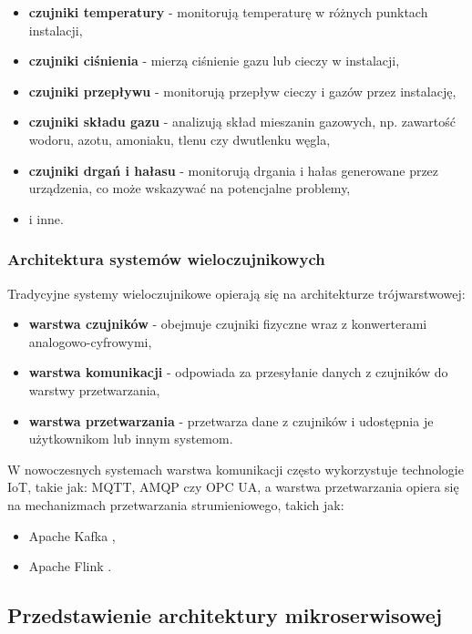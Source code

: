 \begin{itemize}
    \item \textbf{czujniki temperatury} - monitorują temperaturę w różnych punktach instalacji,
    \item \textbf{czujniki ciśnienia} - mierzą ciśnienie gazu lub cieczy w instalacji,
    \item \textbf{czujniki przepływu} - monitorują przepływ cieczy i gazów przez instalację,
    \item \textbf{czujniki składu gazu} - analizują skład mieszanin gazowych, np. zawartość wodoru, azotu, amoniaku, tlenu czy dwutlenku węgla,
    \item \textbf{czujniki drgań i hałasu} - monitorują drgania i hałas generowane przez urządzenia, co może wskazywać na potencjalne problemy,
    \item i inne.
\end{itemize}

\subsubsection{Architektura systemów wieloczujnikowych}
\label{subsubsec:architektura_systemow}

Tradycyjne systemy wieloczujnikowe opierają się na architekturze trójwarstwowej:

\begin{itemize}
    \item \textbf{warstwa czujników} - obejmuje czujniki fizyczne wraz z konwerterami analogowo-cyfrowymi,
    \item \textbf{warstwa komunikacji} - odpowiada za przesyłanie danych z czujników do warstwy przetwarzania,
    \item \textbf{warstwa przetwarzania} - przetwarza dane z czujników i udostępnia je użytkownikom lub innym systemom.
\end{itemize}

W nowoczesnych systemach warstwa komunikacji często wykorzystuje technologie IoT, takie jak: MQTT, AMQP czy OPC UA,
a warstwa przetwarzania opiera się na mechanizmach przetwarzania strumieniowego, takich jak:

\begin{itemize}
    \item Apache Kafka \cite{spark_documentation},
    \item Apache Flink \cite{flink}.
\end{itemize}

\subsection{Przedstawienie architektury mikroserwisowej}
\label{subsec:architektura_mikroserwisowa}

